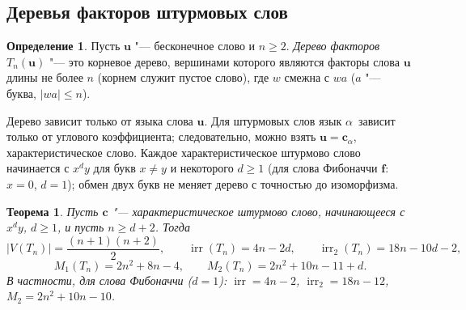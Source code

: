 \documentclass[a4paper,14pt]{extreport}
\theoremstyle{plain}
\newtheorem{theorem}{Теорема}[section]
\theoremstyle{definition}
\newtheorem{definition}{Определение}[section]
\theoremstyle{remark}
\begin{document}
\subsection{Деревья факторов штурмовых слов}

\begin{definition}
	Пусть $\mathbf u$ "--- бесконечное слово и $n\ge2$. \emph{Дерево факторов} $T_n(\mathbf u)$ "--- это корневое дерево, вершинами которого являются факторы слова $\mathbf u$ длины не более $n$
	(корнем служит пустое слово), где $w$ смежна с $wa$ ($a$ "--- буква, $|wa|\le n$).
\end{definition}

Дерево зависит только от языка слова $\mathbf u$. Для штурмовых слов язык $\alpha$~зависит только от углового коэффициента; следовательно, можно взять $\mathbf u=\mathbf c_\alpha$, характеристическое слово.
Каждое характеристическое штурмово слово начинается с $x^dy$ для букв $x\ne y$ и некоторого $d\ge1$ (для слова Фибоначчи $\mathbf f$: $x=0$, $d=1$);
обмен двух букв не меняет дерево с точностью до изоморфизма.

\begin{theorem}\label{thm:factortree}
	Пусть $\mathbf c$ "--- характеристическое штурмово слово, начинающееся с $x^dy$, $d\ge1$, и пусть $n\ge d+2$. Тогда
	\begin{equation}
		|V(T_n)|=\frac{(n+1)(n+2)}2,\qquad \operatorname{irr}(T_n)=4n-2d,\qquad \operatorname{irr}_2(T_n)=18n-10d-2,
	\end{equation}
	\begin{equation}
		M_1(T_n)=2n^2+8n-4,\qquad M_2(T_n)=2n^2+10n-11+d .
	\end{equation}
	В частности, для слова Фибоначчи ($d=1$): $\operatorname{irr}=4n-2$, $\operatorname{irr}_2=18n-12$, $M_2=2n^2+10n-10$.
\end{theorem}
\end{document}
